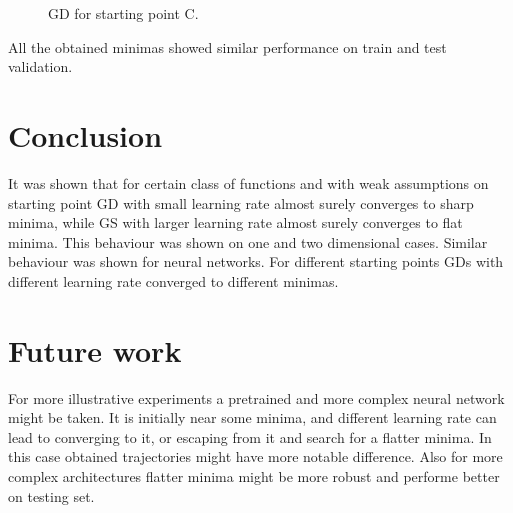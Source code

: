 \documentclass{article}
\theoremstyle{definition}
\begin{document}
\begin{figure}[!htb]
      \caption{GD for starting point C.}
    \endminipage
\end{figure}

All the obtained minimas showed similar performance on train and test validation.

\section{Conclusion}
It was shown that for certain class of functions and with weak assumptions on 
starting point GD with small learning rate almost surely converges to sharp minima, 
while GS with larger learning rate almost surely converges to flat minima. 
This behaviour was shown on one and two dimensional cases. 
Similar behaviour was shown for neural networks. 
For different starting points GDs with different learning rate converged to different minimas. 

\section{Future work}
For more illustrative experiments a pretrained and more complex neural network might be taken. 
It is initially near some minima, and different learning rate can lead to converging to it, 
or escaping from it and search for a flatter minima. 
In this case obtained trajectories might have more notable difference. 
Also for more complex architectures flatter minima might be more robust 
and performe better on testing set. 



\end{document}
